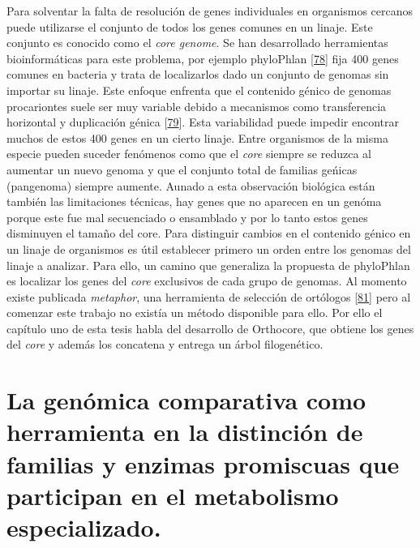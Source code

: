 \documentclass[12pt,twoside]{reedthesis}
\begin{document}
  Para solventar la falta de resolución de genes individuales en
  organismos cercanos puede utilizarse el conjunto de todos los genes
  comunes en un linaje. Este conjunto es conocido como el \emph{core
  genome}. Se han desarrollado herramientas bioinformáticas para este
  problema, por ejemplo phyloPhlan
  {[}\protect\hyperlink{ref-segata_phylophlan_2013}{78}{]} fija 400 genes
  comunes en bacteria y trata de localizarlos dado un conjunto de genomas
  sin importar su linaje. Este enfoque enfrenta que el contenido génico de
  genomas procariontes suele ser muy variable debido a mecanismos como
  transferencia horizontal y duplicación génica
  {[}\protect\hyperlink{ref-land_insights_2015}{79}{]}. Esta variabilidad
  puede impedir encontrar muchos de estos 400 genes en un cierto linaje.
  Entre organismos de la misma especie pueden suceder fenómenos como que
  el \emph{core} siempre se reduzca al aumentar un nuevo genoma y que el
  conjunto total de familias geńicas (pangenoma) siempre aumente. Aunado a
  esta observación biológica están también las limitaciones técnicas, hay
  genes que no aparecen en un genóma porque este fue mal secuenciado o
  ensamblado y por lo tanto estos genes disminuyen el tamaño del core.
  Para distinguir cambios en el contenido génico en un linaje de
  organismos es útil establecer primero un orden entre los genomas del
  linaje a analizar. Para ello, un camino que generaliza la propuesta de
  phyloPhlan es localizar los genes del \emph{core} exclusivos de cada
  grupo de genomas. Al momento existe publicada \emph{metaphor}, una
  herramienta de selección de ortólogos
  {[}\protect\hyperlink{ref-van_der_veen_metaphor_2014}{81}{]} pero al
  comenzar este trabajo no existía un método disponible para ello. Por
  ello el capítulo uno de esta tesis habla del desarrollo de Orthocore,
  que obtiene los genes del \emph{core} y además los concatena y entrega
  un árbol filogenético.
  
  \section{La genómica comparativa como herramienta en la distinción de
  familias y enzimas promiscuas que participan en el metabolismo
  especializado.}\label{la-genomica-comparativa-como-herramienta-en-la-distincion-de-familias-y-enzimas-promiscuas-que-participan-en-el-metabolismo-especializado.}
  
\end{document}
